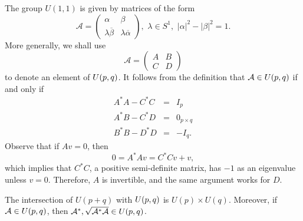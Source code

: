 \bigskip
\hf The group $U(1,1)$ is given by matrices of the form
\begin{displaymath}
    \mathcal{A}=\left(
        \begin{array}{cc}
            \alpha & \beta\\
            \lambda \overline{\beta} & \lambda \overline{\alpha}
        \end{array}\right),\,\,\lambda\in S^1,\,\,|\alpha|^2-|\beta|^2=1.
\end{displaymath}
More generally, we shall use 
\begin{displaymath}
    \mathcal{A}=\left(
        \begin{array}{cc}
            A & B\\
            C & D
        \end{array}\right)
\end{displaymath}
to denote an element of $U(p,q)$. It follows from the definition that $\mathcal{A}\in U(p,q)$ if and only if
\begin{eqnarray*}
    A^\ast A-C^\ast C& = & I_p\\
    A^\ast B-C^\ast D& = & 0_{p\times q}\\
    B^\ast B-D^\ast D& = & -I_q.
\end{eqnarray*}
Observe that if $Av=0$, then
\begin{displaymath}
    0=A^\ast Av=C^\ast Cv+v,
\end{displaymath}
which implies that $C^\ast C$, a positive semi-definite matrix, has $-1$ as an eigenvalue unless $v=0$. Therefore, $A$ is invertible, and the same argument works for $D$.
\begin{lemma}
    The intersection of $U(p+q)$ with $U(p,q)$ is $U(p)\times U(q)$. Moreover, if $\mathcal{A}\in U(p,q)$, then $\mathcal{A}^\ast,\sqrt{\mathcal{A}^\ast\mathcal{A}}\in U(p,q)$.
\end{lemma}
